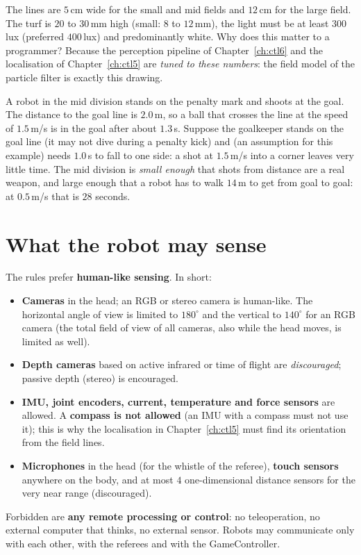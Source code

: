 The lines are $5$\,cm wide for the small and mid fields and $12$\,cm for the large field. The turf is $20$ to $30$\,mm high (small: $8$ to $12$\,mm), the light must be at least $300$\,lux (preferred $400$\,lux) and predominantly white. Why does this matter to a programmer? Because the perception pipeline of Chapter~\ref{ch:ctl6} and the localisation of Chapter~\ref{ch:ctl5} are \emph{tuned to these numbers}: the field model of the particle filter is exactly this drawing.

\begin{example}
A robot in the mid division stands on the penalty mark and shoots at the goal. The distance to the goal line is $2.0$\,m, so a ball that crosses the line at the speed of $1.5$\,m/s is in the goal after about $1.3$\,s. Suppose the goalkeeper stands on the goal line (it may not dive during a penalty kick) and (an assumption for this example) needs $1.0$\,s to fall to one side: a shot at $1.5$\,m/s into a corner leaves very little time. The mid division is \emph{small enough} that shots from distance are a real weapon, and large enough that a robot has to walk $14$\,m to get from goal to goal: at $0.5$\,m/s that is $28$ seconds.
\end{example}

\section*{What the robot may sense}
The rules prefer \textbf{human-like sensing}. In short:
\begin{itemize}[nosep]
 \item \textbf{Cameras} in the head; an RGB or stereo camera is human-like. The horizontal angle of view is limited to $180^{\circ}$ and the vertical to $140^{\circ}$ for an RGB camera (the total field of view of all cameras, also while the head moves, is limited as well).
 \item \textbf{Depth cameras} based on active infrared or time of flight are \emph{discouraged}; passive depth (stereo) is encouraged.
 \item \textbf{IMU, joint encoders, current, temperature and force sensors} are allowed. A \textbf{compass is not allowed} (an IMU with a compass must not use it); this is why the localisation in Chapter~\ref{ch:ctl5} must find its orientation from the field lines.
 \item \textbf{Microphones} in the head (for the whistle of the referee), \textbf{touch sensors} anywhere on the body, and at most $4$ one-dimensional distance sensors for the very near range (discouraged).
\end{itemize}
Forbidden are \textbf{any remote processing or control}: no teleoperation, no external computer that thinks, no external sensor. Robots may communicate only with each other, with the referees and with the GameController.

